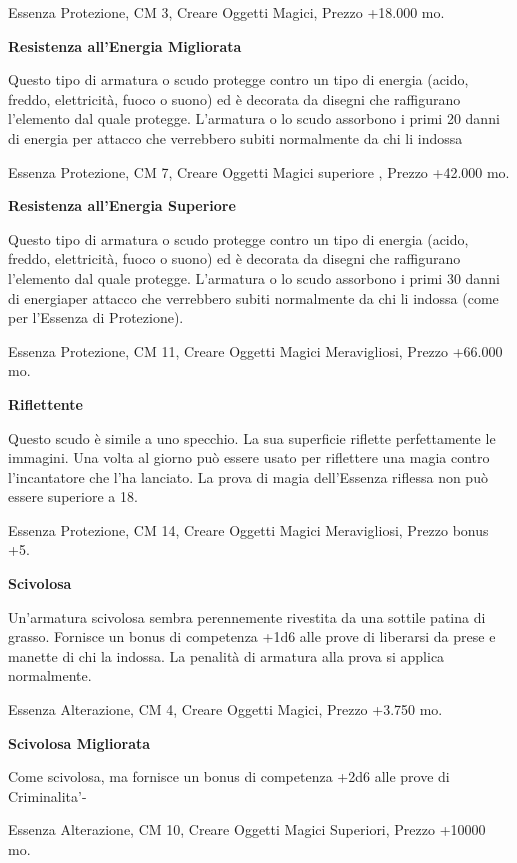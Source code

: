 \documentclass[a4paper,11pt,twoside,openany]{book}
\begin{document}
{Essenza Protezione, CM 3, Creare Oggetti Magici, Prezzo +18.000 mo.

\textbf{Resistenza all'Energia Migliorata}

Questo tipo di armatura o scudo protegge contro un tipo di energia
(acido, freddo, elettricità, fuoco o suono) ed è decorata da disegni
che raffigurano l'elemento dal quale protegge. L'armatura o lo scudo
assorbono i primi 20 danni di energia per attacco che verrebbero subiti
normalmente da chi li indossa

Essenza Protezione, CM 7, Creare Oggetti Magici superiore , Prezzo
+42.000 mo.

\textbf{Resistenza all'Energia Superiore}

Questo tipo di armatura o scudo protegge contro un tipo di energia (acido, freddo, elettricità, fuoco o suono) ed è decorata da disegni che raffigurano l'elemento dal quale protegge. L'armatura o lo scudo assorbono i primi 30 danni di energiaper attacco che verrebbero subiti normalmente da chi li indossa (come per l'Essenza di Protezione).

Essenza Protezione, CM 11, Creare Oggetti Magici Meravigliosi, Prezzo +66.000 mo.

\textbf{Riflettente}

Questo scudo è simile a uno specchio. La sua superficie riflette perfettamente le immagini. Una volta al giorno può essere usato per riflettere una magia contro l'incantatore che l'ha lanciato. La prova di magia dell'Essenza riflessa non può essere superiore a 18.

Essenza Protezione, CM 14, Creare Oggetti Magici Meravigliosi, Prezzo 
bonus +5.

\textbf{Scivolosa}

Un'armatura scivolosa sembra perennemente rivestita da una sottile patina di grasso. Fornisce un bonus di competenza +1d6 alle prove di liberarsi da prese e manette di chi la indossa. La penalità di armatura alla prova si applica normalmente.

Essenza Alterazione, CM 4, Creare Oggetti Magici, Prezzo +3.750 mo.

\textbf{Scivolosa Migliorata}

Come scivolosa, ma fornisce un bonus di competenza +2d6 alle prove di Criminalita'-

Essenza Alterazione, CM 10, Creare Oggetti Magici Superiori, Prezzo +10000 mo.

}
\end{document}
